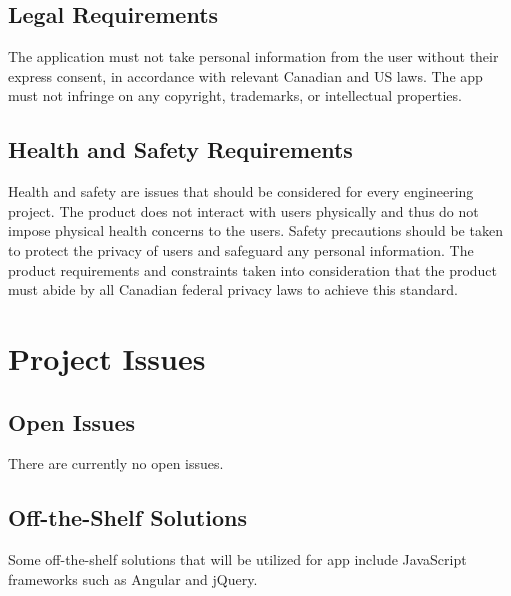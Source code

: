 \documentclass[12pt, titlepage]{article}
\newcommand{\pbox}[1]{\parbox[t]{.85\linewidth}{#1}
}
\newcommand{\myline}{%
	\kern1pt %
	\hrule height 0.8pt
	\kern3pt %
}
\newcommand{\requirement}[7]{

	\noindent
	\vspace{5pt}
	\parbox{\linewidth}{
		\fontsize{10pt}{5pt}\selectfont
		\noindent\textbf{#1} \hspace{26pt}\pbox{\textit{#2}} \\
		\myline
		\textit{Rationale:}	\hspace{10pt} \pbox{#3} \\
		\textit{Fit Criterion:} \pbox{#4} \\
		\textit{Priority:} \hspace{18pt} \pbox{#5} \\
		\textit{Originator:} \hspace{7pt} \pbox{#6} \\
		\textit{History:} \hspace{25pt}{#7} \\
}}
\begin{document}
\subsection{Legal Requirements}

The application must not take personal information from the user without their express consent, in accordance with relevant Canadian and US laws. The app must not infringe on any copyright, trademarks, or intellectual properties.

\subsection{Health and Safety Requirements}
Health and safety are issues that should be considered for every engineering project. The product does not interact with users physically and thus do not impose physical health concerns to the users. Safety precautions should be taken to protect the privacy of users and safeguard any personal information. The product requirements and constraints taken into consideration that the product must abide by all Canadian federal privacy laws to achieve this standard.

\section{Project Issues}

\subsection{Open Issues}
There are currently no open issues.

\subsection{Off-the-Shelf Solutions}
Some off-the-shelf solutions that will be utilized for app include JavaScript frameworks such as Angular and jQuery.
\end{document}
